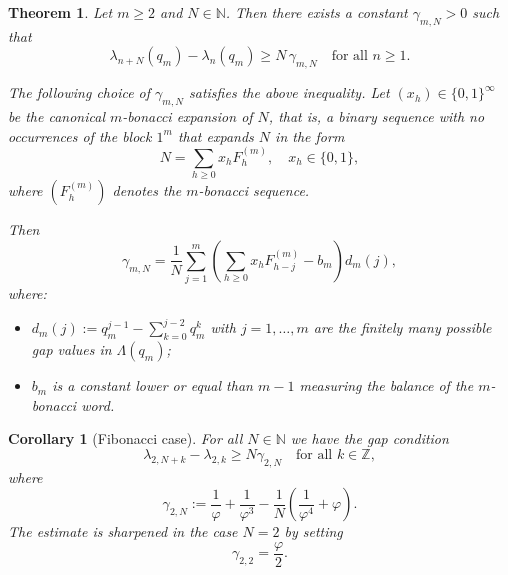 \documentclass[10pt,a4paper]{amsart}
\newtheorem{theorem}{Theorem}
\newtheorem{corollary}{Corollary}
\newcommand{\NN}{\mathbb N}
\newcommand{\ZZ}{\mathbb Z}
\begin{document}
\begin{theorem}\label{thm1i}
Let $m\geq 2$ and $N\in \mathbb{N}$. Then there exists a constant
$\gamma_{m,N}>0$ such that
\begin{equation}\label{gamma}
\lambda_{n+N}(q_m)-\lambda_n(q_m)\geq N\,\gamma_{m,N}
\quad \text{for all } n\geq 1.
\end{equation}

The following choice of $\gamma_{m,N}$ satisfies the above inequality.
Let $(x_h)\in\{0,1\}^\infty$ be the canonical $m$-bonacci expansion of $N$, that is,
a binary sequence with no occurrences of the block $1^m$ that expands $N$ in the form
\[
N=\sum_{h\geq 0} x_h F^{(m)}_h,
\quad x_h\in\{0,1\},
\]
where $(F^{(m)}_h)$ denotes the $m$-bonacci sequence.

Then
\begin{equation}\label{eqgamma}
\gamma_{m,N}
=\frac{1}{N}
\sum_{j=1}^m
\left(
\sum_{h\geq 0} x_h F^{(m)}_{h-j}
- b_m
\right)
d_m(j),
\end{equation}
where:
\begin{itemize}
\item[-] $d_m(j):=q_m^{j-1}-\sum_{k=0}^{j-2} q_m^k$ with $j=1,\dots,m$ are the finitely many possible gap values in $\Lambda(q_m)$;
\item[-] $b_m$ is a constant lower or equal than $m-1$ measuring the balance of the $m$-bonacci word.
\end{itemize}
\end{theorem}

\begin{corollary}[Fibonacci case]\label{cor1}
For all $N\in \NN$ we have the gap condition
\begin{equation}\label{gengapfib}
\lambda_{2,N+k}-\lambda_{2,k}\geq N\gamma_{2,N} \quad \text{for all } k\in \ZZ,
\end{equation}
where
$$\gamma_{2,N}:=\frac{1}{\varphi}+\frac{1}{\varphi^3} -\frac{1}{N}\left(\frac{1}{\varphi^4}+\varphi\right).$$
The estimate is sharpened in the case $N=2$ by setting  $$\gamma_{2,2}=\frac{\varphi}{2}.$$

\end{corollary}
\end{document}
